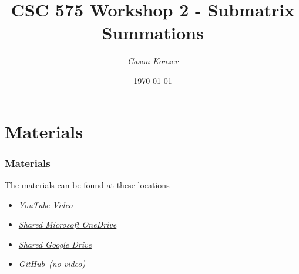 \documentclass{beamer}
\title[Workshop 1]{CSC 575 Workshop 2 - Submatrix Summations}
\author{\XV\textit{\large{\href{https://github.com/casonk}{Cason Konzer}}}\XB}
\institute[UM FLINT]{\normalsize{\textit{\href{mailto:casonk@umich.edu}{casonk@umich.edu}}}}
\date[]{\today}
\newcommand{\XB}{\color{black}}
\newcommand{\XV}{\color{violet}}
\begin{document}
\begin{frame}
    \titlepage
\end{frame}




\section{Materials}

\begin{frame}

    \frametitle{Materials}

    The materials can be found at these locations 

    \vspace{2.5mm}
    \begin{itemize}
        \item \XV\textit{\large{\href{https://youtu.be/zR-o6Jc6k1o}{YouTube Video}}}\XB
        \item \XV\textit{\large{\href{https://umich-my.sharepoint.com/:f:/g/personal/casonk_umich_edu/Eluov0GBscpHpKC6SwS1vQcBpai93NMa307rb038YKU0uA?e=bbhSqh}{Shared Microsoft OneDrive}}}\XB
        \item \XV\textit{\large{\href{https://drive.google.com/drive/folders/1dVEr45BidZYurfp4pKB_3_CDkN-xm0qa?usp=sharing}{Shared Google Drive}}}\XB
        \item \XV\textit{\large{\href{https://github.com/casonk/CSC575-Algorithm_and_Complexity_Analysis/tree/main/WorkShop/WorkShop2}{GitHub}}}\XB \ \emph{(no video)}
    \end{itemize}

\end{frame}
\end{document}
